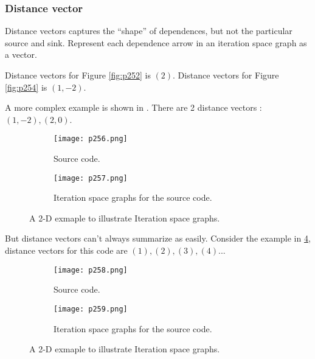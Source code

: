 \subsubsection{Distance vector}

Distance vectors captures the “shape” of dependences,
but not the particular source and sink. Represent each dependence arrow in an iteration space
graph as a vector.

Distance vectors for Figure \ref{fig:p252} is $ (2) $. 
Distance vectors for Figure \ref{fig:p254} is $ (1,-2) $.


A more complex example is shown in \label{fig:p256-7}.
There are 2 distance vectors : $(1,-2), (2,0)$.




\begin{figure}[H]
    \centering
    \begin{subfigure}{0.5\textwidth}
    \centering
        \texttt{[image: p256.png]}
        \caption{Source code.}
        \label{fig:p256}
    \end{subfigure}
    \begin{subfigure}{0.5\textwidth}
    \centering
        \texttt{[image: p257.png]}
        \caption{Iteration space graphs for the source code.}
        \label{fig:p257}
    \end{subfigure}
  
    \caption{A 2-D exmaple to illustrate Iteration space graphs.}
       \label{fig:p256-7}
\end{figure}


But distance vectors can't always summarize as easily. Consider the example in
\ref{fig:p258}, distance vectors for this code are $(1), (2), (3), (4) ...$



\begin{figure}[H]
    \centering
    \begin{subfigure}{0.5\textwidth}
    \centering
        \texttt{[image: p258.png]}
        \caption{Source code.}
        \label{fig:p258}
    \end{subfigure}
    \begin{subfigure}{0.7\textwidth}
    \centering
        \texttt{[image: p259.png]}
        \caption{Iteration space graphs for the source code.}
        \label{fig:p259}
    \end{subfigure}
  
    \caption{A 2-D exmaple to illustrate Iteration space graphs.}
       \label{fig:p258-9}
\end{figure}

